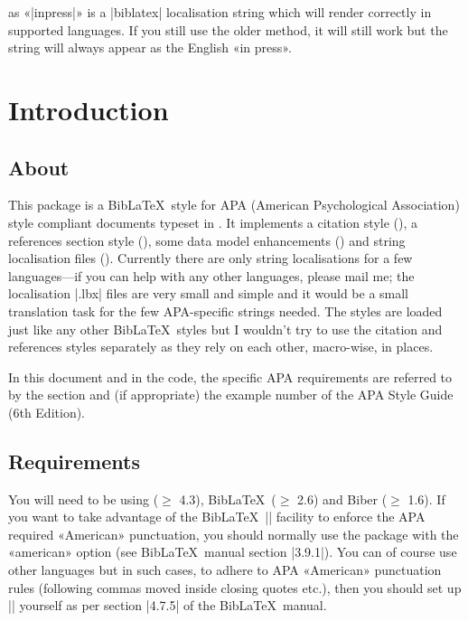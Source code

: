 \documentclass{ltxdockit}
\begin{document}
\noindent as «|inpress|» is a |biblatex| localisation string which will
render correctly in supported languages. If you still use the older method,
it will still work but the string will always appear as the English «in
press».

\section{Introduction}\label{int}

\subsection{About}

This package is a Bib\LaTeX\ style for APA (American Psychological
Association) style compliant documents typeset in \latex. It implements a
citation style (), a references section style
(), some data model enhancements () and string
localisation files (). Currently there are only
string localisations for a few languages---if you can help with any other
languages, please mail me; the localisation |.lbx| files are very small and
simple and it would be a small translation task for the few APA-specific
strings needed. The styles are loaded just like any other Bib\LaTeX\ styles
but I wouldn't try to use the citation and references styles separately as
they rely on each other, macro-wise, in places.

In this document and in the code, the specific APA requirements are
referred to by the section and (if appropriate) the example number of the
APA Style Guide (6th Edition).

\subsection{Requirements}\label{ref:req}

You will need to be using  ($\geq$ 4.3), Bib\LaTeX\ ($\geq$
2.6) and Biber ($\geq$ 1.6). If you want to take advantage of the
Bib\LaTeX\ |\DeclareQuotePunctuation| facility to enforce the APA required
«American» punctuation, you should normally use the  package
with the «american» option (see Bib\LaTeX\ manual section |3.9.1|). You can
of course use other languages but in such cases, to adhere to APA
«American» punctuation rules (following commas moved inside closing quotes
etc.), then you should set up |\DeclareQuotePunctuation| yourself as per
section |4.7.5| of the Bib\LaTeX\ manual.
\end{document}
